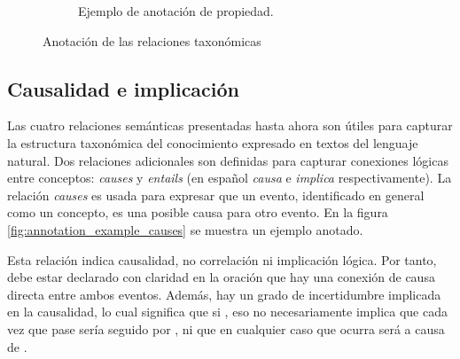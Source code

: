 \begin{figure}[H]
\begin{subfigure}{3.9in}
		\caption{Ejemplo de anotación de propiedad.}
		\label{fig:annotation_example_has_property}
	\end{subfigure}
	\caption{Anotación de las relaciones taxonómicas}
\end{figure}

\subsection{Causalidad e implicación}
Las cuatro relaciones semánticas presentadas hasta ahora son útiles para capturar la estructura taxonómica del conocimiento expresado en textos del lenguaje natural. Dos relaciones adicionales son definidas para capturar conexiones lógicas entre conceptos: \textit{causes} y \textit{entails} (en español \textit{causa} e \textit{implica} respectivamente). La relación \textit{causes} es usada para expresar que un evento, identificado en general como un concepto, es una posible causa para otro evento. En la figura \ref{fig:annotation_example_causes} se muestra un ejemplo anotado.

Esta relación indica causalidad, no correlación ni implicación lógica. Por tanto, debe estar declarado con claridad en la oración que hay una conexión de causa directa entre ambos eventos. Además, hay un grado de incertidumbre implicada en la causalidad, lo cual significa que si , eso no necesariamente implica que cada vez que pase  sería seguido por , ni que en cualquier caso que ocurra  será a causa de .

